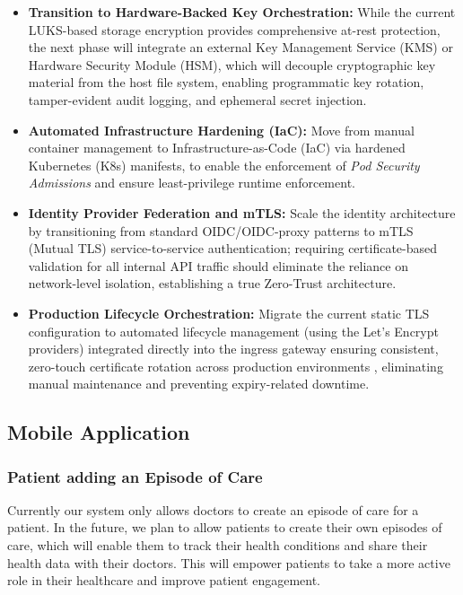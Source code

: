 \begin{itemize}
    \item \textbf{Transition to Hardware-Backed Key Orchestration:} While the current LUKS-based storage encryption provides comprehensive at-rest protection, 
    the next phase will integrate an external Key Management Service (KMS) or Hardware Security Module (HSM), 
    which will decouple cryptographic key material from the host file system, enabling programmatic key rotation, tamper-evident audit logging, and ephemeral secret injection.
    \item \textbf{Automated Infrastructure Hardening (IaC):} Move from manual container management to Infrastructure-as-Code (IaC) via hardened Kubernetes (K8s) manifests, to enable the enforcement of \textit{Pod Security Admissions} and ensure least-privilege runtime enforcement.
    \item \textbf{Identity Provider Federation and mTLS:} Scale the identity architecture by transitioning from standard OIDC/OIDC-proxy patterns to mTLS (Mutual TLS) service-to-service authentication; requiring certificate-based validation for all internal API traffic should eliminate the reliance on network-level isolation, establishing a true Zero-Trust architecture.
    \item \textbf{Production Lifecycle Orchestration:} Migrate the current static TLS configuration to automated lifecycle management (using the Let's Encrypt providers) integrated directly into the ingress gateway ensuring consistent, zero-touch certificate rotation across production environments , eliminating manual maintenance and preventing expiry-related downtime.
\end{itemize}

\subsection{Mobile Application}

\subsubsection{Patient adding an Episode of Care}
Currently our system only allows doctors to create an episode of care for a patient. 
In the future, we plan to allow patients to create their own episodes of care, which will enable them to track their health conditions and share their health data with their doctors.
This will empower patients to take a more active role in their healthcare and improve patient engagement.

